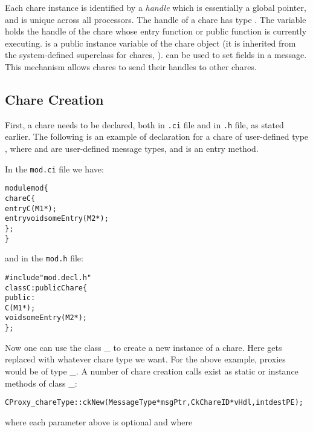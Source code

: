 Each chare instance is identified by a {\em handle} 
which is essentially a global pointer, and is unique across all
processors.  The handle of a chare has type .  The
variable  holds the handle of the
chare whose entry function or public function is currently executing.
 is a public instance variable of the chare object
(it is inherited from the system-defined superclass for chares, ).
 can be used to set fields in a message. This  
mechanism allows chares to send their handles to other chares.

\subsection{Chare Creation}
\label{chare creation}

First, a chare needs to be declared, both in \texttt{.ci} file and
in \texttt{.h} file, as stated earlier. The following is an example of
declaration for a chare of user-defined type , where 
and  are user-defined message types, and 
is an entry method.

In the \texttt{mod.ci} file we have:

\begin{alltt}
module mod \{
  chare C \{
    entry C(M1 *);
    entry void someEntry(M2 *);
  \};
\}
\end{alltt}

and in the \texttt{mod.h} file:

\begin{alltt}
#include "mod.decl.h"
class C : public Chare \{
  public:
    C(M1 *);
    void someEntry(M2 *);
\};
\end{alltt}

Now one can use the class \_ to create a new instance
of a chare.  Here  gets replaced with whatever
chare type we want.  For the above example, proxies would be of
type \_. A number of chare creation calls exist
as static or instance methods of class \_:

\begin{alltt}
   CProxy_chareType::ckNew(MessageType *msgPtr, CkChareID *vHdl, int destPE);
\end{alltt}

where each parameter above is optional and where

